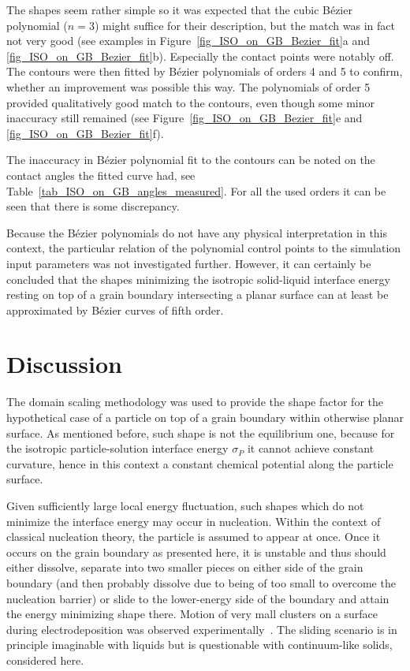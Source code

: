 The shapes seem rather simple so it was expected that the cubic Bézier polynomial ($n=3$) might suffice for their description, but the match was in fact not very good (see examples in Figure~\ref{fig_ISO_on_GB_Bezier_fit}a and \ref{fig_ISO_on_GB_Bezier_fit}b). Especially the contact points were notably off. The contours were then fitted by Bézier polynomials of orders 4 and 5 to confirm, whether an improvement was possible this way. The polynomials of order 5 provided qualitatively good match to the contours, even though some minor inaccuracy still remained (see Figure~\ref{fig_ISO_on_GB_Bezier_fit}e and \ref{fig_ISO_on_GB_Bezier_fit}f). 

The inaccuracy in Bézier polynomial fit to the contours can be noted on the contact angles the fitted curve had, see Table~\ref{tab_ISO_on_GB_angles_measured}. For all the used orders it can be seen that there is some discrepancy.

Because the Bézier polynomials do not have any physical interpretation in this context, the particular relation of the polynomial control points to the simulation input parameters was not investigated further. However, it can certainly be concluded that the shapes minimizing the isotropic solid-liquid interface energy resting on top of a grain boundary intersecting a planar surface can at least be approximated by Bézier curves of fifth order.

\section{Discussion}
The domain scaling methodology was used to provide the shape factor for the hypothetical case of a particle on top of a grain boundary within otherwise planar surface. As mentioned before, such shape is not the equilibrium one, because for the isotropic particle-solution interface energy $\sigma_P$ it cannot achieve constant curvature, hence in this context a constant chemical potential along the particle surface. 

Given sufficiently large local energy fluctuation, such shapes which do not minimize the interface energy may occur in nucleation. Within the context of classical nucleation theory, the particle is assumed to appear at once. Once it occurs on the grain boundary as presented here, it is unstable and thus should either dissolve, separate into two smaller pieces on either side of the grain boundary (and then probably dissolve due to being of too small to overcome the nucleation barrier) or slide to the lower-energy side of the boundary and attain the energy minimizing shape there. Motion of very mall clusters on a surface during electrodeposition was observed experimentally~\cite{Ustarroz2013}. The sliding scenario is in principle imaginable with liquids but is questionable with continuum-like solids, considered here. 

